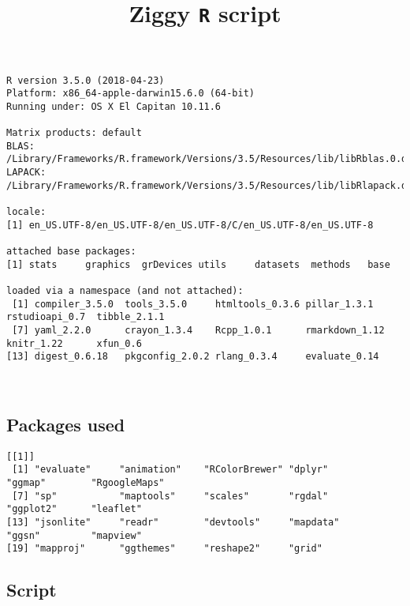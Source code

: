 \documentclass[10,portrait]{article}
\title{Ziggy \texttt{R} script}
\date{}
\begin{document}
\maketitle

\begin{verbatim}
R version 3.5.0 (2018-04-23)
Platform: x86_64-apple-darwin15.6.0 (64-bit)
Running under: OS X El Capitan 10.11.6

Matrix products: default
BLAS: /Library/Frameworks/R.framework/Versions/3.5/Resources/lib/libRblas.0.dylib
LAPACK: /Library/Frameworks/R.framework/Versions/3.5/Resources/lib/libRlapack.dylib

locale:
[1] en_US.UTF-8/en_US.UTF-8/en_US.UTF-8/C/en_US.UTF-8/en_US.UTF-8

attached base packages:
[1] stats     graphics  grDevices utils     datasets  methods   base     

loaded via a namespace (and not attached):
 [1] compiler_3.5.0  tools_3.5.0     htmltools_0.3.6 pillar_1.3.1    rstudioapi_0.7  tibble_2.1.1   
 [7] yaml_2.2.0      crayon_1.3.4    Rcpp_1.0.1      rmarkdown_1.12  knitr_1.22      xfun_0.6       
[13] digest_0.6.18   pkgconfig_2.0.2 rlang_0.3.4     evaluate_0.14  
\end{verbatim}

~

\subsection{Packages used}\label{packages-used}

\begin{verbatim}
[[1]]
 [1] "evaluate"     "animation"    "RColorBrewer" "dplyr"        "ggmap"        "RgoogleMaps" 
 [7] "sp"           "maptools"     "scales"       "rgdal"        "ggplot2"      "leaflet"     
[13] "jsonlite"     "readr"        "devtools"     "mapdata"      "ggsn"         "mapview"     
[19] "mapproj"      "ggthemes"     "reshape2"     "grid"        
\end{verbatim}

\newpage  

\subsection{Script}\label{script}
\end{document}
